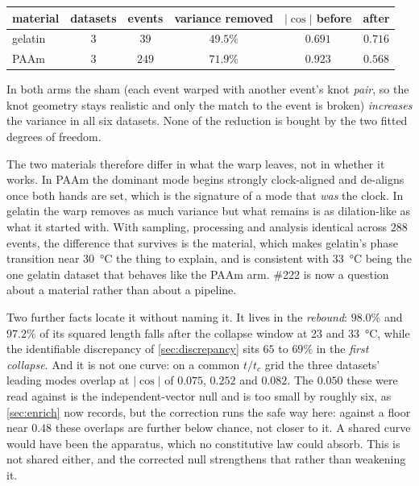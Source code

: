 \documentclass[10pt]{article}
\begin{document}
\begin{center}
\begin{tabular}{lccccc}
\toprule
material & datasets & events & variance removed & $\lvert\cos\rvert$ before & after \\
\midrule
gelatin & $3$ & $39$ & $49.5\%$ & $0.691$ & $0.716$ \\
PAAm & $3$ & $249$ & $\mathbf{71.9\%}$ & $0.923$ & $\mathbf{0.568}$ \\
\bottomrule
\end{tabular}
\end{center}

\noindent In both arms the sham (each event warped with another event's knot \emph{pair}, so
the knot geometry stays realistic and only the match to the event is broken) \emph{increases}
the variance in all six datasets. None of the reduction is bought by the two fitted degrees of
freedom.

The two materials therefore differ in what the warp leaves, not in whether it works. In PAAm the
dominant mode begins strongly clock-aligned and de-aligns once both hands are set, which is the
signature of a mode that \emph{was} the clock. In gelatin the warp removes as much variance but
what remains is as dilation-like as what it started with. With sampling, processing and analysis
identical across $288$ events, the difference that survives is the material, which makes
gelatin's phase transition near \SI{30}{\celsius} the thing to explain, and is consistent with
\SI{33}{\celsius} being the one gelatin dataset that behaves like the PAAm arm. \#222 is now a
question about a material rather than about a pipeline.

Two further facts locate it without naming it. It lives in the \emph{rebound}: $98.0\%$ and
$97.2\%$ of its squared length falls after the collapse window at \SI{23}{} and
\SI{33}{\celsius}, while the identifiable discrepancy of \cref{sec:discrepancy} sits $65$ to
$69\%$ in the \emph{first collapse}. And it is not one curve: on a common $t/t_c$ grid the three
datasets' leading modes overlap at $\lvert\cos\rvert$ of $0.075$, $0.252$ and $0.082$. The
$0.050$ these were read against is the independent-vector null and is too small by roughly six,
as \cref{sec:enrich} now records, but the correction runs the safe way here: against a floor near
$0.48$ these overlaps are further below chance, not closer to it. A shared curve would have been
the apparatus, which no constitutive law could absorb. This is not shared either, and the
corrected null strengthens that rather than weakening it.
\end{document}
